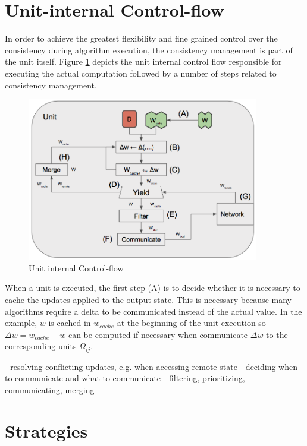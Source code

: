 \section{Unit-internal Control-flow}
In order to achieve the greatest flexibility and fine grained control over the consistency during algorithm execution, the consistency management is part of the unit itself.
Figure \ref{fig:unit_internal_flow} depicts the unit internal control flow responsible for executing the actual computation followed by a number of steps related to consistency management.
\begin{figure}[ht]
\centering
\includegraphics[width=0.9\textwidth]{img/unit_internal_flow.png}
\caption{Unit internal Control-flow}
\label{fig:unit_internal_flow}
\end{figure}
When a unit is executed, the first step (A) is to decide whether it is necessary to cache the updates applied to the output state.
This is necessary because many algorithms require a delta to be communicated instead of the actual value.
In the example, $w$ is cached in $w_{cache}$ at the beginning of the unit execution so $\Delta w = w_{cache} - w$ can be computed if necessary when communicate $\Delta w$ to the corresponding units $\Omega_{ij}$.

- resolving conflicting updates, e.g. when accessing remote state
- deciding when to communicate and what to communicate
- filtering, prioritizing, communicating, merging

\section{Strategies}

	
